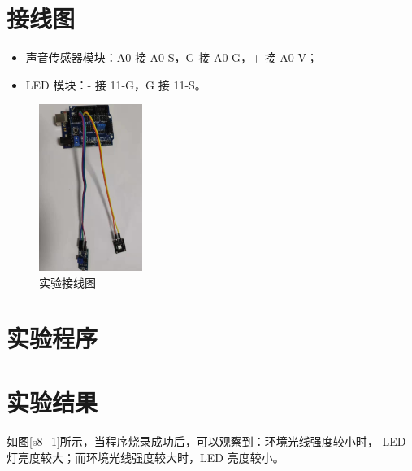 \documentclass[UTF8, oneside]{ctexbook}
\begin{document}
\section{接线图}
\begin{itemize}
    \item 声音传感器模块：A0 接 A0-S，G 接 A0-G，+ 接 A0-V；
    \item LED 模块：- 接 11-G，G 接 11-S。
\end{itemize}
\newpage
\begin{figure}[h]
    \centering
    \includegraphics[width=0.3\textwidth]{./result/sensor/8/lines2.png}
    \caption{实验接线图}
    \label{s8_line}
\end{figure}

\section{实验程序}


\section{实验结果}
\paragraph{}
如图\ref{s8_1}所示，当程序烧录成功后，可以观察到：环境光线强度较小时，
LED 灯亮度较大；而环境光线强度较大时，LED 亮度较小。
\end{document}
